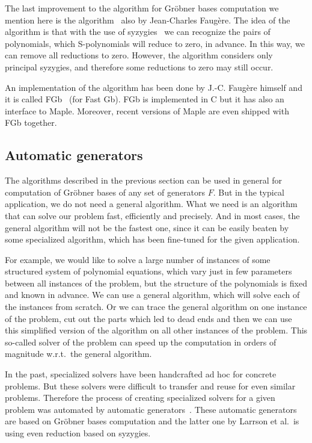 The last improvement to the algorithm for Gr\"obner bases computation we mention here is the \FFFFF{} algorithm~\cite{F5} also by Jean-Charles Faug\`ere.
The idea of the algorithm is that with the use of syzygies~\cite{Cox-Little-Shea2015} we can recognize the pairs of polynomials, which S-polynomials will reduce to zero, in advance.
In this way, we can remove all reductions to zero.
However, the \FFFFF{} algorithm considers only principal syzygies, and therefore some reductions to zero may still occur.

An implementation of the \FFFF{} algorithm has been done by J.-C. Faug\`ere himself and it is called FGb~\cite{fgb} (for Fast Gb).
FGb is implemented in C but it has also an interface to Maple.
Moreover, recent versions of Maple are even shipped with FGb together.

\subsection{Automatic generators}
The algorithms described in the previous section can be used in general for computation of Gr\"obner bases of any set of generators $F$.
But in the typical application, we do not need a general algorithm.
What we need is an algorithm that can solve our problem fast, efficiently and precisely.
And in most cases, the general algorithm will not be the fastest one, since it can be easily beaten by some specialized algorithm, which has been fine-tuned for the given application.

For example, we would like to solve a large number of instances of some structured system of polynomial equations, which vary just in few parameters between all instances of the problem, but the structure of the polynomials is fixed and known in advance.
We can use a general algorithm, which will solve each of the instances from scratch.
Or we can trace the general algorithm on one instance of the problem, cut out the parts which led to dead ends and then we can use this simplified version of the algorithm on all other instances of the problem.
This so-called solver of the problem can speed up the computation in orders of magnitude w.r.t.\ the general algorithm.

In the past, specialized solvers have been handcrafted ad hoc for concrete problems.
But these solvers were difficult to transfer and reuse for even similar problems.
Therefore the process of creating specialized solvers for a given problem was automated by automatic generators~\cite{AutoGen, Larsson2017}.
These automatic generators are based on Gr\"obner bases computation and the latter one by Larrson et al.\ is using even reduction based on syzygies.

